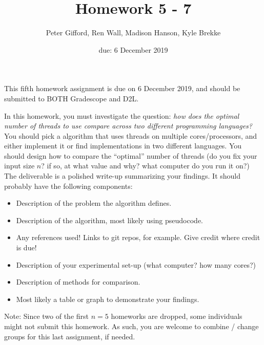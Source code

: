 \documentclass{article}
\author{Peter Gifford, Ren Wall, Madison Hanson, Kyle Brekke}
\date{due: 6 December 2019}
\title{Homework 5 - 7}
\begin{document}
\maketitle

This fifth homework assignment is due on 6 December 2019, and should be
submitted to BOTH Gradescope and D2L.

In this homework, you must investigate the question: \emph{how does the optimal
number of threads to use compare across two different programming languages?}
You should pick a algorithm that uses threads on multiple cores/processors,
and either implement it or find implementations in
two different languages. You should design how to compare the ``optimal'' number
of threads (do you fix your input size $n$?
if so, at what value and why? what computer do you
run it on?) The deliverable is a polished write-up summarizing your findings.
It should probably have the following components:
\begin{itemize}
    \item Description of the problem the algorithm defines.
    \item Description of the algorithm, most likely using pseudocode.
    \item Any references used! Links to git repos, for example.  Give credit
        where credit is due!
    \item Description of your experimental set-up (what computer? how many
        cores?)
    \item Description of methods for comparison.
    \item Most likely a table or graph to demonstrate your findings.
\end{itemize}

Note: Since two of the first $n=5$ homeworks are dropped, some individuals might
not submit this homework.  As such, you are welcome to combine / change groups
for this last assignment, if needed.
\end{document}
